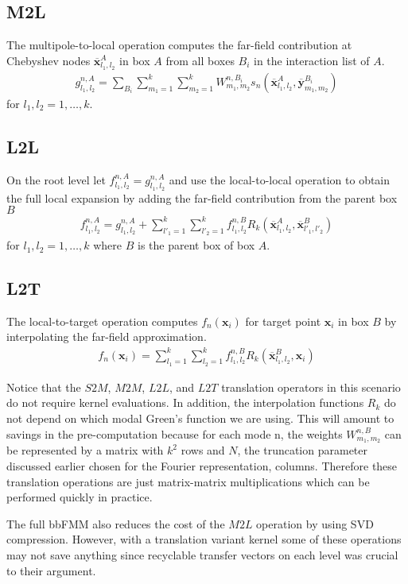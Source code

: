 \documentclass[11pt, oneside]{article}   	%
\begin{document}
\subsection{M2L}
The multipole-to-local operation computes the far-field contribution at Chebyshev nodes $\mathbf{\overline{x}}_{l_1,l_2}^A$ in box $A$ from all boxes $B_i$ in the interaction list of $A$.
\begin{align}
g_{l_1,l_2}^{n,A} = \sum_{B_i} \sum_{m_1=1}^k\sum_{m_2=1}^k W_{m_1,m_2}^{n,B_i} s_n(\mathbf{\overline{x}}^{A}_{l_1,l_2},\mathbf{\overline{y}}^{B_i}_{m_1,m_2})
\end{align}
for $l_1,l_2 = 1,\dots,k$.
\subsection{L2L}
On the root level let $f^{n,A}_{l_1,l_2}=g^{n,A}_{l_1,l_2}$ and use the local-to-local operation to obtain the full local expansion by adding the far-field contribution from the parent box $B$
\begin{align}
f^{n,A}_{l_1,l_2}=g^{n,A}_{l_1,l_2} + \sum_{l'_1=1}^k \sum_{l'_2=1}^k f^{n,B}_{l_1,l_2} R_k(\mathbf{\overline{x}}_{l_1,l_2}^A,\mathbf{\overline{x}}_{l'_1,l'_2}^B)
\end{align}
for $l_1,l_2 = 1,\dots,k$ where $B$ is the parent box of box $A$.
\subsection{L2T}
The local-to-target operation computes $f_n(\mathbf{x}_i)$ for target point $\mathbf{x}_i$ in box $B$ by interpolating the far-field approximation.
\begin{align}
f_n(\mathbf{x}_i)=\sum_{l_1=1}^k \sum_{l_2=1}^kf^{n,B}_{l_1,l_2} R_k(\mathbf{\overline{x}}_{l_1,l_2}^B,\mathbf{x}_i)
\end{align}

Notice that the $S2M$, $M2M$, $L2L$, and $L2T$ translation operators in this scenario do not require kernel evaluations. In addition, the interpolation functions $R_k$ do not depend on which modal Green's function we are using. This will amount to savings in the pre-computation because for each mode n, the weights $W^{n,B}_{m_1,m_2}$ can be represented by a matrix with $k^2$ rows and $N$, the truncation parameter discussed earlier chosen for the Fourier representation, columns. Therefore these translation operations are just matrix-matrix multiplications which can be performed quickly in practice.

The full bbFMM also reduces the cost of the $M2L$ operation by using SVD compression. However, with a translation variant kernel some of these operations may not save anything since recyclable transfer vectors on each level was crucial to their argument.
\end{document}
